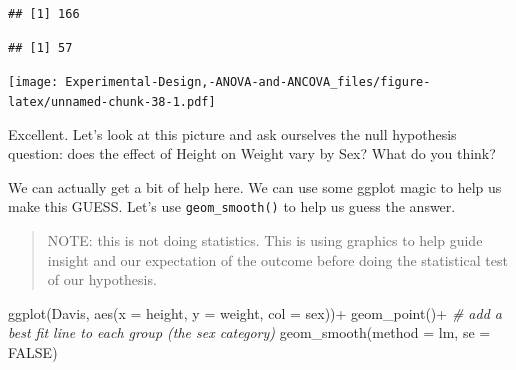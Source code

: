 \documentclass[
]{book}
\newenvironment{Shaded}{\begin{snugshade}}{\end{snugshade}}
\newcommand{\AttributeTok}[1]{\textcolor[rgb]{0.77,0.63,0.00}{#1}}
\newcommand{\CommentTok}[1]{\textcolor[rgb]{0.56,0.35,0.01}{\textit{#1}}}
\newcommand{\ConstantTok}[1]{\textcolor[rgb]{0.00,0.00,0.00}{#1}}
\newcommand{\DecValTok}[1]{\textcolor[rgb]{0.00,0.00,0.81}{#1}}
\newcommand{\FunctionTok}[1]{\textcolor[rgb]{0.00,0.00,0.00}{#1}}
\newcommand{\NormalTok}[1]{#1}
\newcommand{\OtherTok}[1]{\textcolor[rgb]{0.56,0.35,0.01}{#1}}
\newcommand{\SpecialCharTok}[1]{\textcolor[rgb]{0.00,0.00,0.00}{#1}}
\begin{document}
\begin{verbatim}
## [1] 166
\end{verbatim}

\begin{Shaded}
\end{Shaded}

\begin{verbatim}
## [1] 57
\end{verbatim}

\begin{Shaded}
\end{Shaded}

\texttt{[image: Experimental-Design,-ANOVA-and-ANCOVA\_files/figure-latex/unnamed-chunk-38-1.pdf]}

Excellent. Let's look at this picture and ask ourselves the null hypothesis question: does the effect of Height on Weight vary by Sex? What do you think?

We can actually get a bit of help here. We can use some ggplot magic to help us make this GUESS. Let's use \texttt{geom\_smooth()} to help us guess the answer.

\begin{quote}
NOTE: this is not doing statistics. This is using graphics to help guide insight and our expectation of the outcome before doing the statistical test of our hypothesis.
\end{quote}

\begin{Shaded}
\begin{Highlighting}[]
\FunctionTok{ggplot}\NormalTok{(Davis, }\FunctionTok{aes}\NormalTok{(}\AttributeTok{x =}\NormalTok{ height, }\AttributeTok{y =}\NormalTok{ weight, }\AttributeTok{col =}\NormalTok{ sex))}\SpecialCharTok{+}
  \FunctionTok{geom\_point}\NormalTok{()}\SpecialCharTok{+}
  \CommentTok{\# add a best fit line to each group (the sex category)}
  \FunctionTok{geom\_smooth}\NormalTok{(}\AttributeTok{method =}\NormalTok{ lm, }\AttributeTok{se =} \ConstantTok{FALSE}\NormalTok{)}
\end{Highlighting}
\end{Shaded}
\end{document}
